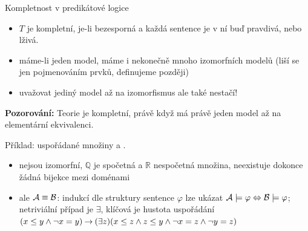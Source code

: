 \documentclass{beamer}
\begin{document}
\begin{frame}{Kompletnost v predikátové logice}


    
    \begin{itemize}
        \item $T$ je \alert{kompletní}, je-li bezesporná a každá \alert{sentence} je v ní buď pravdivá, nebo lživá. \pause
        \item máme-li jeden model, máme i nekonečně mnoho \alert{izomorfních} modelů (liší se jen pojmenováním prvků, definujeme později)\pause
        \item uvažovat jediný model \alert{až na izomorfismus} ale také \alert{nestačí}!\pause
    \end{itemize}
    
 
    \pause
    \textbf{Pozorování:} Teorie je kompletní, právě když má právě jeden model \alert{až na elementární ekvivalenci}.   

    \pause
    Příklad: uspořádané množiny  a .\pause
     \begin{itemize}
        \item \alert{nejsou izomorfní}, $\mathbb Q$ je spočetná a $\mathbb R$ nespočetná množina, neexistuje dokonce žádná \alert{bijekce} mezi doménami\pause
        \item \alert{ale $\mathcal{A}\equiv\mathcal{B}$}: indukcí dle struktury sentence $\varphi$ lze ukázat $\mathcal{A}\models\varphi\Leftrightarrow\mathcal{B}\models\varphi$; netriviální případ je $\exists$, klíčová je \alert{hustota} uspořádání $(x\leq y\land \neg x=y)\mathbin{\rightarrow}(\exists z)(x\leq z\land z\leq y\land \neg x=z\land\neg y=z)$
     \end{itemize}     

\end{frame}
\end{document}
